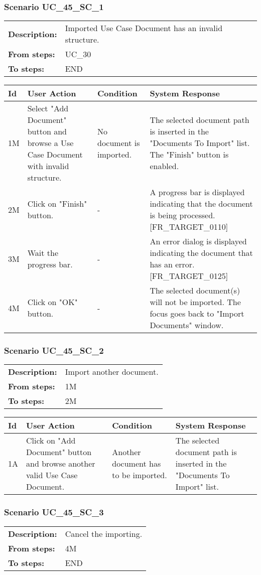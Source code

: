 \documentclass[a4paper,11pt]{article}
\newcommand{\bl}{\\ \hline}
\begin{document}
\subsubsection*{Scenario UC_45_SC_1}
\begin{tabular}{p{1in}p{4in}}
{\bf Description:} & Imported Use Case Document has an invalid structure. \\
{\bf From steps:} & UC_30#2M \\
{\bf To steps:} & END \\
\end{tabular}
 
\begin{tabular}{|p{0.8in}|p{1.6in}|p{1.6in}|p{1.6in}|}
\hline
Id & User Action & Condition & System Response  \bl 
1M & Select "Add Document" button and browse a Use Case Document with invalid structure. & No document is imported. & The selected document path is inserted in the "Documents To Import" list. The "Finish" button is enabled. \bl 
2M & Click on "Finish" button. & - & A progress bar is displayed indicating that the document is being processed. [FR_TARGET_0110] \bl 
3M & Wait the progress bar. & - & An error dialog is displayed indicating the document that has an error. [FR_TARGET_0125] \bl 
4M & Click on "OK" button. & - & The selected document(s) will not be imported. The focus goes back to "Import Documents" window. \bl 
\end{tabular}
\subsubsection*{Scenario UC_45_SC_2}
\begin{tabular}{p{1in}p{4in}}
{\bf Description:} & Import another document. \\
{\bf From steps:} & 1M \\
{\bf To steps:} & 2M \\
\end{tabular}
 
\begin{tabular}{|p{0.8in}|p{1.6in}|p{1.6in}|p{1.6in}|}
\hline
Id & User Action & Condition & System Response  \bl 
1A & Click on "Add Document" button and browse another valid Use Case Document. & Another document has to be imported. & The selected document path is inserted in the "Documents To Import" list. \bl 
\end{tabular}
\subsubsection*{Scenario UC_45_SC_3}
\begin{tabular}{p{1in}p{4in}}
{\bf Description:} & Cancel the importing. \\
{\bf From steps:} & 4M \\
{\bf To steps:} & END \\
\end{tabular}
 
\end{document}
